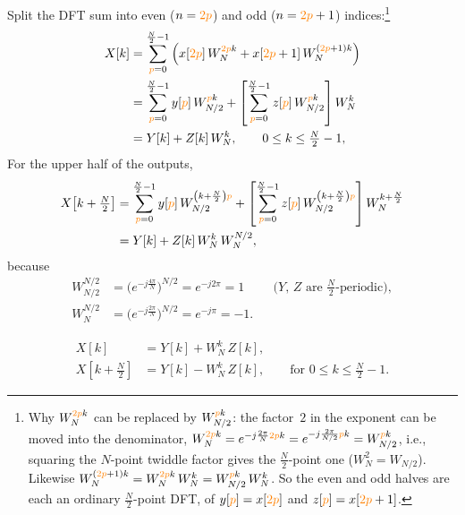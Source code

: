 \documentclass[handout_subfiles_root.tex]{subfiles}
\newcommand{\HandoutTwoP}{\textcolor{orange}{2p}}
\newcommand{\HandoutP}{\textcolor{orange}{p}}
\begin{document}
\noindent Split the DFT sum into even ($n=\HandoutTwoP$) and odd ($n=\HandoutTwoP+1$) indices:\footnote{Why $W_N^{\HandoutTwoP k}$ can be replaced by $W_{N/2}^{\HandoutP k}$: the factor~$2$ in the exponent can be moved into the denominator, $W_N^{\HandoutTwoP k} = e^{-j\frac{2\pi}{N}\HandoutTwoP k} = e^{-j\frac{2\pi}{N/2}\HandoutP k} = W_{N/2}^{\HandoutP k}$, i.e., squaring the $N$-point twiddle factor gives the $\tfrac{N}{2}$-point one ($W_N^2 = W_{N/2}$). Likewise $W_N^{(\HandoutTwoP+1)k} = W_N^{\HandoutTwoP k}\,W_N^{k} = W_{N/2}^{\HandoutP k}\,W_N^{k}$. So the even and odd halves are each an ordinary $\tfrac{N}{2}$-point DFT, of $y[\HandoutP]=x[\HandoutTwoP]$ and $z[\HandoutP]=x[\HandoutTwoP+1]$.}
\begin{align*}
X[k] &= \sum_{\HandoutP=0}^{\frac{N}{2}-1}\Big(x[\HandoutTwoP]\,W_N^{\HandoutTwoP k} + x[\HandoutTwoP+1]\,W_N^{(\HandoutTwoP+1)k}\Big) \\
&= \sum_{\HandoutP=0}^{\frac{N}{2}-1} y[\HandoutP]\,W_{N/2}^{\HandoutP k}
 + \left[\sum_{\HandoutP=0}^{\frac{N}{2}-1} z[\HandoutP]\,W_{N/2}^{\HandoutP k}\right] W_N^{k} \\
&= Y[k] + Z[k]\,W_N^{k}, \qquad 0\le k\le \tfrac{N}{2}-1,
\end{align*}
For the upper half of the outputs,
\begin{align*}
X\!\left[k+\tfrac{N}{2}\right] &= \sum_{\HandoutP=0}^{\frac{N}{2}-1} y[\HandoutP]\,W_{N/2}^{\left(k+\frac{N}{2}\right)\HandoutP}
 + \left[\sum_{\HandoutP=0}^{\frac{N}{2}-1} z[\HandoutP]\,W_{N/2}^{\left(k+\frac{N}{2}\right)\HandoutP}\right] W_N^{k+\frac{N}{2}} \\
&= Y[k] + Z[k]\,W_N^{k}\,W_N^{N/2},
\end{align*}
because
\begin{align*}
W_{N/2}^{N/2} &= \Big(e^{-j\frac{4\pi}{N}}\Big)^{N/2} = e^{-j2\pi} = 1
  && \text{($Y$, $Z$ are $\tfrac{N}{2}$-periodic)}, \\
W_N^{N/2} &= \Big(e^{-j\frac{2\pi}{N}}\Big)^{N/2} = e^{-j\pi} = -1.
\end{align*}

\begin{factbox}[title={Radix-2 DIT butterfly}]
\begin{align*}
X[k] &= Y[k] + W_N^{k}\,Z[k], \\
X\!\left[k+\tfrac{N}{2}\right] &= Y[k] - W_N^{k}\,Z[k],
\qquad \text{for } 0\le k\le \tfrac{N}{2}-1.
\end{align*}
\end{factbox}
\end{document}

